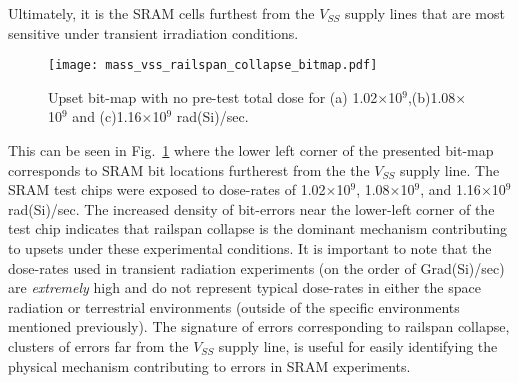 Ultimately, it is the SRAM cells furthest from the $V_{SS}$ supply lines that are most sensitive under transient irradiation conditions.
\begin{figure}[htbp]
    \begin{center}
        \texttt{[image: mass\_vss\_railspan\_collapse\_bitmap.pdf]}
    \end{center}
    \caption{Upset bit-map with no pre-test total dose for (a) 1.02$\times$10$^9$,(b)1.08$\times$10$^9$ and (c)1.16$\times$10$^9$ rad(Si)/sec.}
    \label{fig:railspan_coll_bit_map}
\end{figure}
This can be seen in Fig.~\ref{fig:railspan_coll_bit_map} where the lower left corner of the presented bit-map corresponds to SRAM bit locations furtherest from the the $V_{SS}$ supply line.
The SRAM test chips were exposed to dose-rates of 1.02$\times$10$^9$, 1.08$\times$10$^9$, and 1.16$\times$10$^9$ rad(Si)/sec.
The increased density of bit-errors near the lower-left corner of the test chip indicates that railspan collapse is the dominant mechanism contributing to upsets under these experimental conditions.
It is important to note that the dose-rates used in transient radiation experiments (on the order of Grad(Si)/sec) are \emph{extremely} high and do not represent typical dose-rates in either the space radiation or terrestrial environments (outside of the specific environments mentioned previously).
The signature of errors corresponding to railspan collapse, clusters of errors far from the $V_{SS}$ supply line, is useful for easily identifying the physical mechanism contributing to errors in SRAM experiments.




